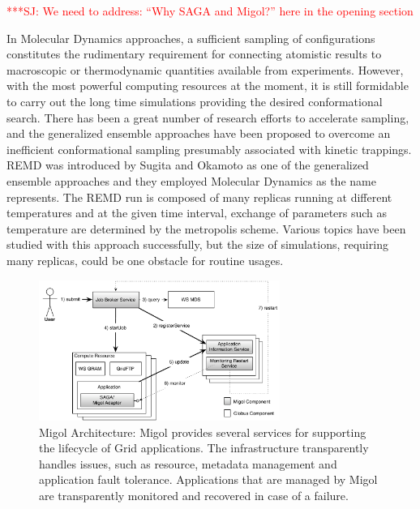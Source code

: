 \documentclass[times, 10pt,twocolumn]{article}
\newcommand{\jhanote}[1]{ {\textcolor{red} { ***SJ: #1 }}}
\newcommand{\jhanote}[1]{}
\begin{document}
  \jhanote{We need to address: ``Why SAGA and Migol?'' here in the
    opening section}



In Molecular Dynamics approaches, a sufficient sampling of
configurations constitutes the rudimentary requirement for connecting
atomistic results to macroscopic or thermodynamic quantities available
from experiments.  However, with the most powerful computing resources
at the moment, it is still formidable to carry out the long time
simulations providing the desired conformational search.  There has
been a great number of research efforts to accelerate sampling, and
the generalized ensemble approaches have been proposed to overcome an
inefficient conformational sampling presumably associated with kinetic
trappings.  REMD was introduced by Sugita and Okamoto as one of the
generalized ensemble approaches and they employed Molecular Dynamics
as the name represents.  The REMD run is composed of many replicas
running at different temperatures and at the given time interval,
exchange of parameters such as temperature are determined by the
metropolis scheme.  Various topics have been studied with this
approach successfully, but the size of simulations, requiring many
replicas, could be one obstacle for routine usages.  

\label{sec:migol}

\begin{figure}[t]
            \centering
                \includegraphics[width=0.7\textwidth]{migol_architecture}
            \caption{Migol Architecture: Migol provides several services for supporting the lifecycle of Grid applications. The infrastructure transparently handles issues, such as resource, metadata management and application fault tolerance.  Applications that are managed by Migol are transparently monitored and recovered in case of a failure.}
            \label{fig:migol_architecture} 
\end{figure}           
\end{document}
